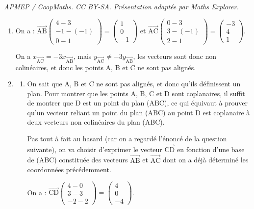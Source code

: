 \documentclass[10pt]{article}
\providecommand{\vect}[1]{\overrightarrow{#1}}
\begin{document}
\noindent\textit{APMEP / CoopMaths. CC BY-SA. Présentation adaptée par Maths Explorer.}\par\medskip
\medskip

\begin{enumerate}
\item On a : \quad $\vect{\mathrm{AB}}\begin{pmatrix} 4 - 3\\ -1 - (-1) \\ 0-1\end{pmatrix} = \begin{pmatrix}1\\0\\-1\end{pmatrix}$ \quad et \quad $\vect{\mathrm{AC}}\begin{pmatrix} 0 - 3\\ 3 - (-1) \\ 2-1\end{pmatrix} = \begin{pmatrix}-3\\4\\1\end{pmatrix}$.

On a $x_{\vect{\mathrm{AC}}} = -3 x_{\vect{\mathrm{AB}}}$, mais $y_{\vect{\mathrm{AC}}} \neq -3 y_{\vect{\mathrm{AB}}}$, les vecteurs sont donc non colinéaires, et donc les points A, B et C ne sont pas alignés.

\item
	\begin{enumerate}
		\item On sait que A, B et C ne sont pas alignés, et donc qu'ils définissent un plan. Pour montrer que les points A, B, C et D sont coplanaires, il suffit de montrer que D est un point du plan (ABC), ce qui équivaut à prouver qu'un vecteur reliant un point du plan (ABC) au point D est coplanaire à deux vecteurs non colinéaires du plan (ABC).

		Pas tout à fait au hasard (car on a regardé l'énoncé de la question suivante), on va choisir d'exprimer le vecteur $\vect{\mathrm{CD}}$ en fonction d'une base de (ABC) constituée des vecteurs $\vect{\mathrm{AB}}$ et $\vect{\mathrm{AC}}$ dont on a déjà déterminé les coordonnées précédemment.

		On a : \quad $\vect{\mathrm{CD}}\begin{pmatrix}4 - 0\\3 - 3\\-2 - 2\end{pmatrix} = \begin{pmatrix}4\\0\\-4\end{pmatrix}$.


\end{enumerate}
\end{enumerate}
\end{document}
